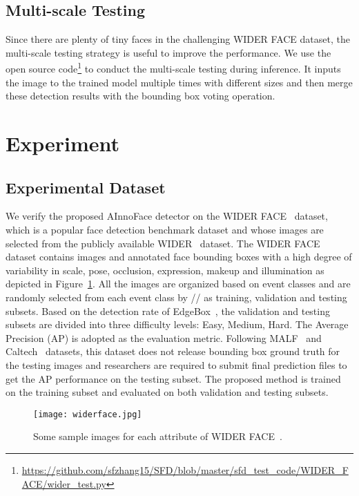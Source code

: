 \documentclass{article} \usepackage{nips13submit_e,times}
\begin{document}
\subsection{Multi-scale Testing}
Since there are plenty of tiny faces in the challenging WIDER FACE dataset, the multi-scale testing strategy is useful to improve the performance. We use the open source code\footnote{\url{https://github.com/sfzhang15/SFD/blob/master/sfd_test_code/WIDER_FACE/wider_test.py}} to conduct the multi-scale testing during inference. It inputs the image to the trained model multiple times with different sizes and then merge these detection results with the bounding box voting operation.


\section{Experiment}

\subsection{Experimental Dataset}
We verify the proposed AInnoFace detector on the WIDER FACE~\cite{DBLP:conf/cvpr/YangLLT16} dataset, which is a popular face detection benchmark dataset and whose images are selected from the publicly available WIDER~\cite{xiong2015wider} dataset. The WIDER FACE dataset contains  images and  annotated face bounding boxes with a high degree of variability in scale, pose, occlusion, expression, makeup and illumination as depicted in Figure~\ref{fig:widerface}. All the images are organized based on  event classes and are randomly selected from each event class by // as training, validation and testing subsets. Based on the detection rate of EdgeBox~\cite{DBLP:conf/eccv/ZitnickD14}, the validation and testing subsets are divided into three difficulty levels: Easy, Medium, Hard. The Average Precision (AP) is adopted as the evaluation metric. Following MALF~\cite{DBLP:conf/fgr/YangYLL15} and Caltech~\cite{dollar2012pedestrian} datasets, this dataset does not release bounding box ground truth for the testing images and researchers are required to submit final prediction files to get the AP performance on the testing subset. The proposed method is trained on the training subset and evaluated on both validation and testing subsets.
\begin{figure}[!h]
\centering
\texttt{[image: widerface.jpg]}
\caption{Some sample images for each attribute of WIDER FACE~\cite{DBLP:conf/cvpr/YangLLT16}.}
\label{fig:widerface}
\end{figure}
\end{document}
